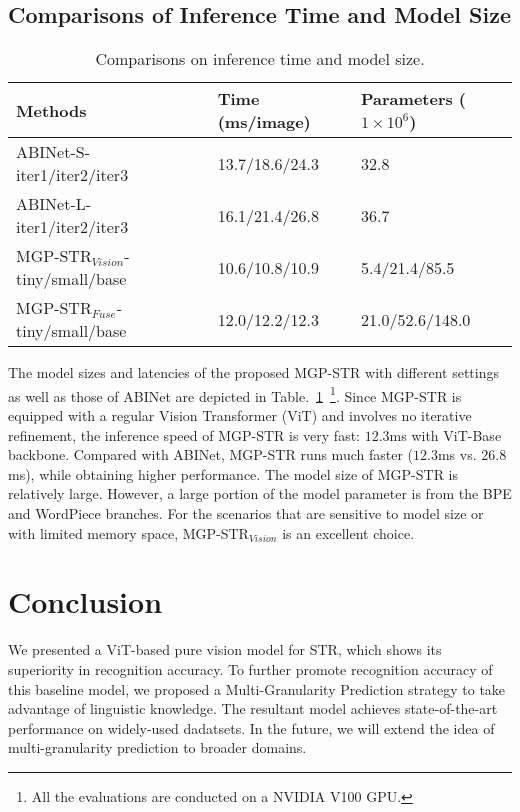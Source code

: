 \documentclass[runningheads]{llncs}
\begin{document}
\subsection{Comparisons of Inference Time and Model Size} 

\begin{table}[h]\centering
\setlength{\tabcolsep}{5pt}
\caption{Comparisons on inference time and model size.}
\label{tab:speed}
\begin{tabular}{|l|l|l|}
\hline
{Methods}  & {Time} (ms/image) & Parameters ($1 \times 10^6$)  \\
\hline
ABINet-S-iter1/iter2/iter3 & 13.7/18.6/24.3 & 32.8 \\
\hline
ABINet-L-iter1/iter2/iter3 & 16.1/21.4/26.8 & 36.7 \\
\hline
MGP-STR$_{Vision}$-tiny/small/base  & 10.6/10.8/10.9  & 5.4/21.4/85.5 \\
\hline
MGP-STR$_{Fuse}$-tiny/small/base  & 12.0/12.2/12.3  & 21.0/52.6/148.0 \\
\hline
\end{tabular}
\end{table}

The model sizes and latencies of the proposed MGP-STR with different settings as well as those of ABINet are depicted in Table.~\ref{tab:speed}~\footnote{All the evaluations are conducted on a NVIDIA V100 GPU.}. Since MGP-STR is equipped with a regular Vision Transformer (ViT) and involves no iterative refinement, the inference speed of MGP-STR is very fast: $12.3$ms with ViT-Base backbone. Compared with ABINet, MGP-STR runs much faster ($12.3$ms vs. $26.8$ms), while obtaining higher performance. The model size of MGP-STR is relatively large. However, a large portion of the model parameter is from the BPE and WordPiece branches. For the scenarios that are sensitive to model size or with limited memory space, MGP-STR$_{Vision}$ is an excellent choice.

\section{Conclusion}

We presented a ViT-based pure vision model for STR, which shows its superiority in recognition accuracy. To further promote recognition accuracy of this baseline model, we proposed a Multi-Granularity Prediction strategy to take advantage of linguistic knowledge. The resultant model achieves state-of-the-art performance on widely-used dadatsets. In the future, we will extend the idea of multi-granularity prediction to broader domains.
\end{document}
